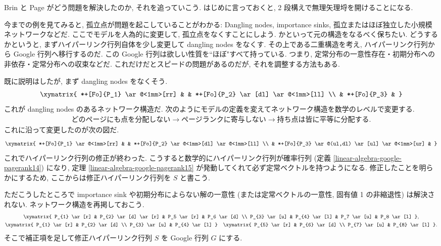 \documentclass[openany, a4paper, oneside]{jsbook}
\begin{document}
Brin と Page がどう問題を解決したのか, それを追っていこう.
はじめに言っておくと, 2 段構えで無理矢理埒を開けることになる.

今までの例を見てみると, 孤立点が問題を起こしていることがわかる:
Dangling nodes, importance sinks, 孤立またはほぼ独立した小規模ネットワークなどだ.
ここでモデルを人為的に変更して, 孤立点をなくすことにしよう.
かといって元の構造をなるべく保ちたい.
どうするかというと, まずハイパーリンク行列自体を少し変更して dangling nodes をなくす.
その上である二重構造を考え, ハイパーリンク行列から Google 行列へ移行するのだ.
この Google 行列は欲しい性質を``ほぼ"すべて持っている.
つまり, 定常分布の一意性存在・初期分布への非依存・定常分布への収束などだ.
これだけだとスピードの問題があるのだが, それを調整する方法もある.

既に説明はしたが, まず dangling nodes をなくそう.
\begin{gather}
 \xymatrix{
  *+[Fo]{P_1} \ar@<1mm>[rr] & & *+[Fo]{P_2} \ar[dl] \ar@<1mm>[ll] \\
  & *+[Fo]{P_3} &
 }
\end{gather}
これが dangling nodes のあるネットワーク構造だ.
次のようにモデルの定義を変えてネットワーク構造を数学のレベルで変更する.
\begin{align}
 \text{どのページにも点を分配しない}
 \to \text{ページランクに寄与しない}
 \to \text{持ち点は皆に平等に分配する}.
\end{align}
これに沿って変更したのが次の図だ.
\begin{gather}
 \xymatrix{
   *+[Fo]{P_1} \ar@<1mm>[rr] & & *+[Fo]{P_2} \ar@<1mm>[dl] \ar@<1mm>[ll] \\
   & *+[Fo]{P_3} \ar@(ul,dl) \ar[ul] \ar@<1mm>[ur] &
 }
\end{gather}
これでハイパーリンク行列の修正が終わった.
こうすると数学的にハイパーリンク行列が確率行列 (定義 \ref{linear-algebra-google-pagerank14}) になり,
定理 \ref{linear-algebra-google-pagerank15} が発動してくれて必ず定常ベクトルを持つようになる.
修正したことを明らかにするため, ここからは修正ハイパーリンク行列を $S$ と書こう.

ただこうしたところで importance sink や初期分布によらない解の一意性 (または定常ベクトルの一意性,
固有値 1 の非縮退性) は解決されない.
ネットワーク構造を再掲しておこう.
\begin{gather}
 \xymatrix{
  P_{1} \ar[r] & P_{2} \ar[d] \ar[r] & P_5 \ar[r] & P_6 \ar[d] \\
  P_{3} \ar[u] & P_{4} \ar[l]        & P_7 \ar[u] & P_8 \ar[l]
 }, \\
 \xymatrix{
  P_{1} \ar[r] & P_{2} \ar[d] \\
  P_{3} \ar[u] & P_{4} \ar[l]
 }
 \quad
 \xymatrix{
  P_{5} \ar[r] & P_{6} \ar[d] \\
  P_{7} \ar[u] & P_{8} \ar[l]
 }.
\end{gather}
そこで補正項を足して修正ハイパーリンク行列 $S$ を Google 行列 $G$ にする.
\end{document}
